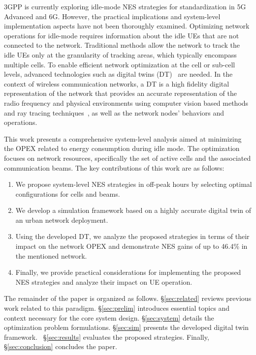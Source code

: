 3GPP is currently exploring idle-mode NES strategies for standardization in 5G Advanced and 6G. However, the practical implications and system-level implementation aspects have not been thoroughly examined. Optimizing network operations for idle-mode requires information about the idle UEs that are not connected to the network. Traditional methods allow the network to track the idle UEs only at the granularity of tracking areas, which typically encompass multiple cells. To enable efficient network optimization at the cell or sub-cell levels, advanced technologies such as digital twins (DT)~\cite{DT} are needed. { %
In the context of wireless communication networks, a DT is a high fidelity digital representation of the network that provides an accurate representation of the radio frequency and physical environments using computer vision based methods~\cite{jiang2024learnablewirelessdigitaltwins} and ray tracing techniques~\cite{ray_tracing}, as well as the network nodes' behaviors and operations.}

This work presents a comprehensive system-level analysis aimed at minimizing the OPEX related to energy consumption during idle mode. The optimization focuses on network resources, specifically the set of active cells and the associated communication beams.
The key contributions of this work are as follows:
\begin{enumerate}[leftmargin=*, nosep, topsep=0pt]
    \item We propose system-level NES strategies in off-peak hours by selecting optimal configurations for cells and beams.

    \item We develop a simulation framework based on a highly accurate digital twin of an urban network deployment.
        
    \item Using the developed DT, we analyze the proposed strategies in terms of their impact on the network OPEX and demonstrate NES gains of up to 46.4\% in the mentioned network.
    
    \item Finally, we provide practical considerations for implementing the proposed NES strategies and analyze their impact on UE operation.
\end{enumerate}

The remainder of the paper is organized as follows. \S\ref{sec:related} reviews previous work related to this paradigm. \S\ref{sec:prelim} introduces essential topics and context necessary for the core system design. 
\S\ref{sec:system} details the  optimization problem formulations.
\S\ref{sec:sim} presents the developed digital twin framework. 
~\S\ref{sec:results} evaluates the proposed strategies. 
Finally, \S\ref{sec:conclusion} concludes the paper. 
